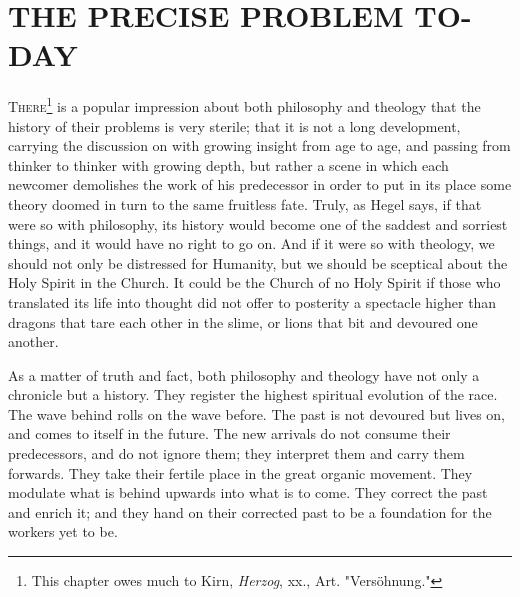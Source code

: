 \documentclass[12pt,letterpaper,oneside]{book}
\begin{document}
\chapter{THE PRECISE PROBLEM TO-DAY} 

\textsc{There}\footnote{This chapter owes much to Kirn, \textit{Herzog}, xx., Art. "Vers\"{o}hnung."} 
is a popular impression about both 
philosophy and theology that the history 
of their problems is very sterile; that it is 
not a long development, carrying the discussion 
on with growing insight from age to age, and 
passing from thinker to thinker with growing 
depth, but rather a scene in which each newcomer 
demolishes the work of his predecessor 
in order to put in its place some theory doomed 
in turn to the same fruitless fate. Truly, as 
Hegel says, if that were so with philosophy, 
its history would become one of the saddest 
and sorriest things, and it would have no 
right to go on. And if it were so with theology, 
we should not only be distressed for Humanity, 
but we should be sceptical about the Holy Spirit 
in the Church. It could be the Church of 
no Holy Spirit if those who translated its 
life into thought did not offer to posterity a 
spectacle higher than dragons that tare each 
other in the slime, or lions that bit and 
devoured one another. 

As a matter of truth and fact, both philosophy 
and theology have not only a chronicle but a 
history. They register the highest spiritual 
evolution of the race. The wave behind rolls on 
the wave before. The past is not devoured but 
lives on, and comes to itself in the future. The 
new arrivals do not consume their predecessors, 
and do not ignore them; they interpret them 
and carry them forwards. They take their 
fertile place in the great organic movement. 
They modulate what is behind upwards into 
what is to come. They correct the past and 
enrich it; and they hand on their corrected past 
to be a foundation for the workers yet to be. 
\end{document}
